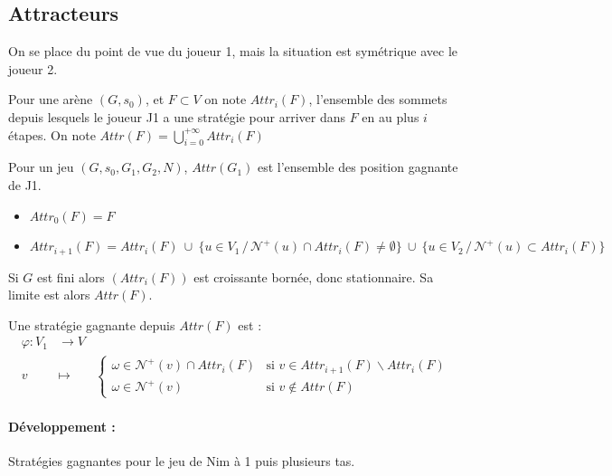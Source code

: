 \subsection{Attracteurs}

On se place du point de vue du joueur 1, mais la situation est symétrique avec le joueur 2.

\begin{definition}[Attracteur]
	Pour une arène $(G, s_0)$, et $F \subset V$ on note $Attr_i(F)$, l'ensemble des sommets depuis lesquels le joueur J1 a une stratégie pour arriver dans $F$ en au plus $i$ étapes. On note $Attr(F) = \bigcup\limits_{i = 0}^{+\infty} Attr_i(F)$
\end{definition}

\begin{proposition}
	Pour un jeu $(G, s_0, G_1, G_2, N)$, $Attr(G_1)$ est l'ensemble des position gagnante de J1.
\end{proposition}

\begin{proposition}\enspace
	\begin{itemize}[label=$\bullet$]
		\item $Attr_0(F) = F$
		\item $Attr_{i+1}(F) = Attr_i(F) \: \cup \: \{u \in V_1 \, / \, \mathcal N^+(u) \cap Attr_i(F) \neq \emptyset\} \: \cup \: \{u \in V_2 \, / \, \mathcal N^+(u) \subset Attr_i(F)\} $
	\end{itemize}
\end{proposition}

\begin{proposition}
	Si $G$ est fini alors $\left( Attr_i(F) \right)$ est croissante bornée, donc stationnaire. Sa limite est alors $Attr(F)$.
	
	Une stratégie gagnante depuis $Attr(F)$ est :
	$$ \begin{array}{rcl}
		\varphi : V_1 & \to V\\
		v & \mapsto & \left\{ \begin{array}{ll}
			\omega \in \mathcal N^+(v) \cap Attr_i(F) & \text{si } v \in Attr_{i+1}(F) \backslash Attr_i(F)\\
			\omega \in \mathcal N^+(v) & \text{si } v \notin Attr(F)
		\end{array} \right.
	\end{array} $$
\end{proposition}

\paragraph{Développement :} Stratégies gagnantes pour le jeu de Nim à 1 puis plusieurs tas.

